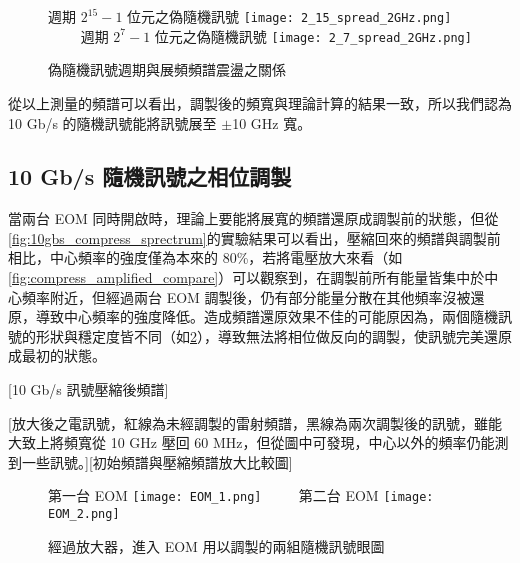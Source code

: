 \documentclass[class=NCU_thesis, crop=false]{standalone}
\begin{document}
\begin{figure}[!hbt]
    \centering
    \subcaptionbox
        {週期 $2^{15}-1$ 位元之偽隨機訊號
        \label{fig:subfig_fig1}}
        {\texttt{[image: 2\_15\_spread\_2GHz.png]}}
    ~~~~
    \subcaptionbox
        {週期 $2^{7}-1$ 位元之偽隨機訊號
        \label{fig:subfig_fig2}}
        {\texttt{[image: 2\_7\_spread\_2GHz.png]}}
    \caption{偽隨機訊號週期與展頻頻譜震盪之關係}
    \label{fig:different_length_PRBS}
\end{figure}

從以上測量的頻譜可以看出，調製後的頻寬與理論計算的結果一致，所以我們認為 10 Gb/s 的隨機訊號能將訊號展至 $\pm$10 GHz 寬。

\subsection{10 Gb/s 隨機訊號之相位調製}

當兩台 EOM 同時開啟時，理論上要能將展寬的頻譜還原成調製前的狀態，但從\cref{fig:10gbs_compress_sprectrum}的實驗結果可以看出，壓縮回來的頻譜與調製前相比，中心頻率的強度僅為本來的 80\%，若將電壓放大來看（如\cref{fig:compress_amplified_compare}）可以觀察到，在調製前所有能量皆集中於中心頻率附近，但經過兩台 EOM 調製後，仍有部分能量分散在其他頻率沒被還原，導致中心頻率的強度降低。造成頻譜還原效果不佳的可能原因為，兩個隨機訊號的形狀與穩定度皆不同（如\cref{fig:amplified_signal}），導致無法將相位做反向的調製，使訊號完美還原成最初的狀態。

[10 Gb/s 訊號壓縮後頻譜]

[放大後之電訊號，紅線為未經調製的雷射頻譜，黑線為兩次調製後的訊號，雖能大致上將頻寬從 10 GHz 壓回 60 MHz，但從圖中可發現，中心以外的頻率仍能測到一些訊號。][初始頻譜與壓縮頻譜放大比較圖]

\begin{figure}[!hbt]
    \centering
    \subcaptionbox
        {第一台 EOM 
        \label{fig:subfig_fig1}}
        {\texttt{[image: EOM\_1.png]}}
    ~~~~
    \subcaptionbox
        {第二台 EOM
        \label{fig:subfig_fig2}}
        {\texttt{[image: EOM\_2.png]}}
    \caption{經過放大器，進入 EOM 用以調製的兩組隨機訊號眼圖}
    \label{fig:amplified_signal}
\end{figure}
\end{document}
